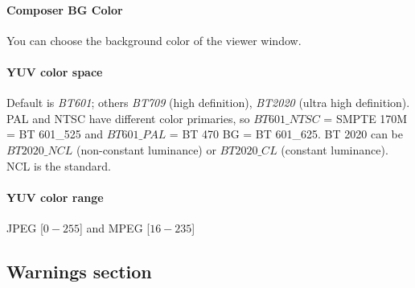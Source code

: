 \paragraph{Composer BG Color}  You can choose the background color of the viewer window.
\paragraph{YUV color space}  Default is \textit{BT601}; others \textit{BT709} (high definition), \textit{BT2020} (ultra high definition). PAL and NTSC have different color primaries, so $BT 601\_NTSC$ = SMPTE 170M = BT 601\_525 and $BT 601\_PAL$ = BT 470 BG = BT 601\_625. BT 2020 can be $BT 2020\_NCL$ (non-constant luminance) or $BT 2020\_CL$ (constant luminance). NCL is the standard.
\paragraph{YUV color range}  JPEG [$0-255$] and MPEG [$16-235$]


\subsection{Warnings section}%
\label{sub:warnings_section}

